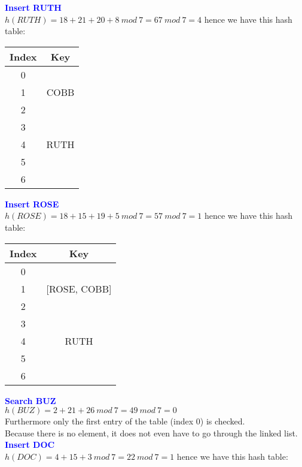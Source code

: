 \documentclass[11pt]{article}
\begin{document}
\begin{enumerate}
\textbf{\textcolor{blue}{Insert RUTH}}
    \\ $h(RUTH)=18+21+20+8\ mod\ 7 = 67\ mod\ 7 = 4$ hence we have this hash table:
    \begin{center}
    \begin{tabular}{ | c | c | } 
        \hline
        Index & Key \\ 
        \hline\hline
        0 & \\
        \hline
        1 & COBB\\
        \hline
        2 & \\
        \hline
        3 & \\
        \hline
        4 & RUTH\\
        \hline
        5 & \\
        \hline
        6 & \\
        \hline
    \end{tabular}
    \end{center}
\textbf{\textcolor{blue}{Insert ROSE}}
    \\ $h(ROSE)=18+15+19+5\ mod\ 7 = 57\ mod\ 7 = 1$ hence we have this hash table:
    \begin{center}
    \begin{tabular}{ | c | c | } 
        \hline
        Index & Key \\ 
        \hline\hline
        0 & \\
        \hline
        1 & [ROSE, COBB]\\
        \hline
        2 & \\
        \hline
        3 & \\
        \hline
        4 & RUTH\\
        \hline
        5 & \\
        \hline
        6 & \\
        \hline
    \end{tabular}
    \end{center}
\textbf{\textcolor{blue}{Search BUZ}}
    \\ $h(BUZ)=2+21+26\ mod\ 7 = 49\ mod\ 7 = 0$ 
    \\ Furthermore only the first entry of the table (index $0$) is checked.
    \\ Because there is no element, it does not even have to go through the linked list.
    \\
\textbf{\textcolor{blue}{Insert DOC}}
    \\ $h(DOC)=4+15+3\ mod\ 7 = 22\ mod\ 7 = 1$ hence we have this hash table:

\end{enumerate}
\end{document}
